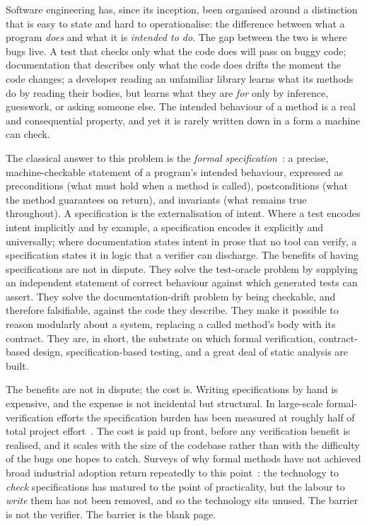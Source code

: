 Software engineering has, since its inception, been organised around a
distinction that is easy to state and hard to operationalise: the difference
between what a program \emph{does} and what it is \emph{intended to do}. The
gap between the two is where bugs live. A test that checks only what the code
does will pass on buggy code; documentation that describes only what the code
does drifts the moment the code changes; a developer reading an unfamiliar
library learns what its methods do by reading their bodies, but learns what
they are \emph{for} only by inference, guesswork, or asking someone else. The
intended behaviour of a method is a real and consequential property, and yet
it is rarely written down in a form a machine can check.

The classical answer to this problem is the \emph{formal
specification}~\cite{meyer1992design, jml, leavens2006design}: a precise,
machine-checkable statement of a program's intended behaviour, expressed as
preconditions (what must hold when a method is called), postconditions (what
the method guarantees on return), and invariants (what remains true
throughout). A specification is the externalisation of intent. Where a test
encodes intent implicitly and by example, a specification encodes it
explicitly and universally; where documentation states intent in prose that
no tool can verify, a specification states it in logic that a verifier can
discharge. The benefits of having specifications are not in dispute. They
solve the test-oracle problem by supplying an independent statement of
correct behaviour against which generated tests can assert. They solve the
documentation-drift problem by being checkable, and therefore falsifiable,
against the code they describe. They make it possible to reason modularly
about a system, replacing a called method's body with its contract. They are,
in short, the substrate on which formal verification, contract-based design,
specification-based testing, and a great deal of static analysis are built.

The benefits are not in dispute; the cost is. Writing specifications by hand
is expensive, and the expense is not incidental but structural. In
large-scale formal-verification efforts the specification burden has been
measured at roughly half of total project
effort~\cite{andronick_large-scale_2012, klein2014sel4, matichuk_cost_2015}.
The cost is paid up front, before any verification benefit is realised, and
it scales with the size of the codebase rather than with the difficulty of
the bugs one hopes to catch. Surveys of why formal methods have not achieved
broad industrial adoption return repeatedly to this
point~\cite{hall1990seven, zimmermann2019lightweight}: the technology to
\emph{check} specifications has matured to the point of practicality, but the
labour to \emph{write} them has not been removed, and so the technology sits
unused. The barrier is not the verifier. The barrier is the blank page.

